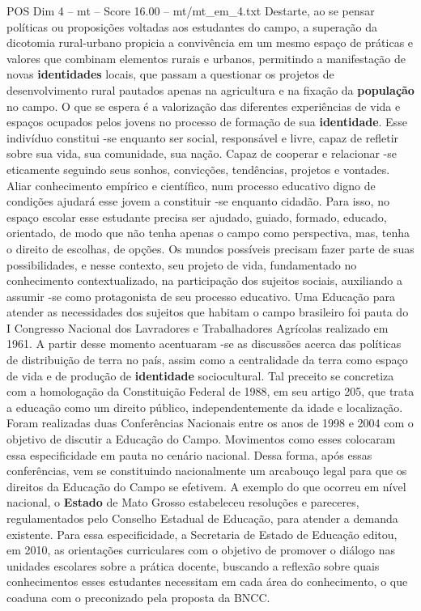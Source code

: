 \begin{textsample}{POS Dim 4 – mt – Score 16.00 – mt/mt\_em\_4.txt}
Destarte, ao se pensar políticas ou proposições voltadas aos estudantes do campo, a superação da dicotomia rural-urbano propicia a convivência em um mesmo espaço de práticas e valores que combinam elementos rurais e urbanos, permitindo a manifestação de novas \textbf{identidades} locais, que passam a questionar os projetos de desenvolvimento rural pautados apenas na agricultura e na fixação da \textbf{população} no campo.
O que se espera é a valorização das diferentes experiências de vida e espaços ocupados pelos jovens no processo de formação de sua \textbf{identidade}.
Esse indivíduo constitui -se enquanto ser social, responsável e livre, capaz de refletir sobre sua vida, sua comunidade, sua nação.
Capaz de cooperar e relacionar -se eticamente seguindo seus sonhos, convicções, tendências, projetos e vontades.
Aliar conhecimento empírico e científico, num processo educativo digno de condições ajudará esse jovem a constituir -se enquanto cidadão.
Para isso, no espaço escolar esse estudante precisa ser ajudado, guiado, formado, educado, orientado, de modo que não tenha apenas o campo como perspectiva, mas, tenha o direito de escolhas, de opções.
Os mundos possíveis precisam fazer parte de suas possibilidades, e nesse contexto, seu projeto de vida, fundamentado no conhecimento contextualizado, na participação dos sujeitos sociais, auxiliando a assumir -se como protagonista de seu processo educativo.
Uma Educação para atender as necessidades dos sujeitos que habitam o campo brasileiro foi pauta do I Congresso Nacional dos Lavradores e Trabalhadores Agrícolas realizado em 1961.
A partir desse momento acentuaram -se as discussões acerca das políticas de distribuição de terra no país, assim como a centralidade da terra como espaço de vida e de produção de \textbf{identidade} sociocultural.
Tal preceito se concretiza com a homologação da Constituição Federal de 1988, em seu artigo 205, que trata a educação como um direito público, independentemente da idade e localização.
Foram realizadas duas Conferências Nacionais entre os anos de 1998 e 2004 com o objetivo de discutir a Educação do Campo.
Movimentos como esses colocaram essa especificidade em pauta no cenário nacional.
Dessa forma, após essas conferências, vem se constituindo nacionalmente um arcabouço legal para que os direitos da Educação do Campo se efetivem.
A exemplo do que ocorreu em nível nacional, o \textbf{Estado} de Mato Grosso estabeleceu resoluções e pareceres, regulamentados pelo Conselho Estadual de Educação, para atender a demanda existente.
Para essa especificidade, a Secretaria de Estado de Educação editou, em 2010, as orientações curriculares com o objetivo de promover o diálogo nas unidades escolares sobre a prática docente, buscando a reflexão sobre quais conhecimentos esses estudantes necessitam em cada área do conhecimento, o que coaduna com o preconizado pela proposta da BNCC.

\end{textsample}
